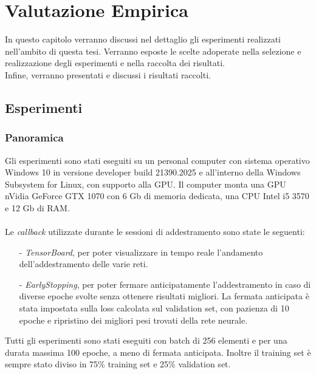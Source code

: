 \chapter{Valutazione Empirica}
In questo capitolo verranno discussi nel dettaglio gli esperimenti realizzati nell'ambito di questa tesi. Verranno esposte le scelte adoperate nella selezione e realizzazione degli esperimenti e nella raccolta dei risultati.\\
Infine, verranno presentati e discussi i risultati raccolti.
\section{Esperimenti}
\subsection{Panoramica} 
Gli esperimenti sono stati eseguiti su un personal computer con sistema operativo Windows 10 in versione developer build 21390.2025 e all'interno della Windows Subsystem for Linux, con supporto alla GPU. Il computer monta una GPU nVidia GeForce GTX 1070 con 6 Gb di memoria dedicata, una CPU Intel i5 3570 e 12 Gb di RAM.\\\\
Le \textit{callback} utilizzate durante le sessioni di addestramento sono state le seguenti:
\begin{itemize}
    \item[-] \textit{TensorBoard}, per poter visualizzare in tempo reale l'andamento dell'addestramento delle varie reti.
    
    \item[-] \textit{EarlyStopping}, per poter fermare anticipatamente l'addestramento in caso di diverse epoche svolte senza ottenere risultati migliori. La fermata anticipata è stata impostata sulla loss calcolata sul validation set, con pazienza di 10 epoche e ripristino dei migliori pesi trovati della rete neurale.
    
\end{itemize}
Tutti gli esperimenti sono stati eseguiti con batch di 256 elementi e per una durata massima 100 epoche, a meno di fermata anticipata. Inoltre il training set è sempre stato diviso in 75\% training set e 25\% validation set.

